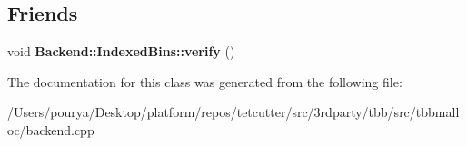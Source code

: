 \subsection*{Friends}
\begin{DoxyCompactItemize}
\item 
\hypertarget{classrml_1_1internal_1_1FreeBlock_a5ded4302f29ea027d939c14136d0ef70}{}void {\bfseries Backend\+::\+Indexed\+Bins\+::verify} ()\label{classrml_1_1internal_1_1FreeBlock_a5ded4302f29ea027d939c14136d0ef70}

\end{DoxyCompactItemize}


The documentation for this class was generated from the following file\+:\begin{DoxyCompactItemize}
\item 
/\+Users/pourya/\+Desktop/platform/repos/tetcutter/src/3rdparty/tbb/src/tbbmalloc/backend.\+cpp\end{DoxyCompactItemize}

